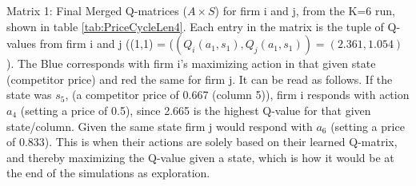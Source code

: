 \documentclass{article}
\begin{document}
\begin{center}
    Matrix 1: Final Merged Q-matrices ($A\times S$) for firm i and j, from the K=6 run, shown in table \ref{tab:PriceCycleLen4}. Each entry in the matrix is the tuple of Q-values from firm i and j ((1,1) = ($(Q_i(a_1,s_1),Q_j(a_1,s_1)) =(2.361 , 1.054) $).
    The Blue corresponds with firm i's maximizing action in that given state (competitor price) and red the same for firm j. It can be read as follows. If the state was $s_5$, (a competitor price of 0.667 (column 5)), firm i responds with action $a_4$ (setting a price of 0.5), since 2.665 is the highest Q-value for that given state/column. Given the same state firm j would respond with $a_6$ (setting a price of 0.833). This is when their actions are solely based on their learned Q-matrix, and thereby maximizing the Q-value given a state, which is how it would be at the end of the simulations as exploration. 
\end{center}
\end{document}
